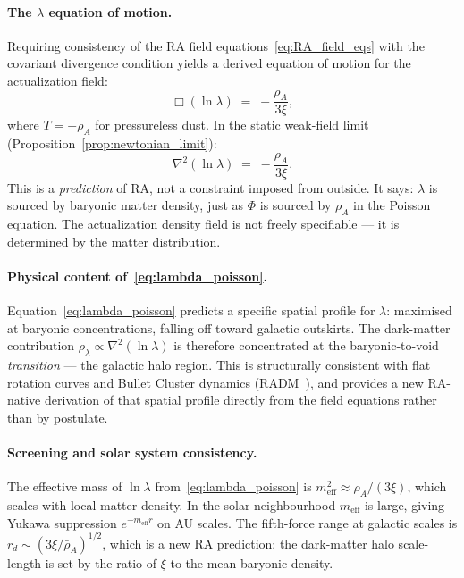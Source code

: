 \documentclass[11pt,a4paper]{article}
\theoremstyle{plain}
\theoremstyle{definition}
\theoremstyle{remark}
\begin{document}
\begin{description}
\paragraph{The $\lambda$ equation of motion.}
Requiring consistency of the RA field equations~\eqref{eq:RA_field_eqs} with
the covariant divergence condition yields a derived equation of motion for the
actualization field:
\begin{equation}
  \Box(\ln\lambda) \;=\; -\frac{\rho_A}{3\xi},
  \label{eq:lambda_eom}
\end{equation}
where $T = -\rho_A$ for pressureless dust. In the static weak-field limit
(Proposition~\ref{prop:newtonian_limit}):
\begin{equation}
  \nabla^2(\ln\lambda) \;=\; -\frac{\rho_A}{3\xi}.
  \label{eq:lambda_poisson}
\end{equation}
This is a \emph{prediction} of RA, not a constraint imposed from outside.
It says: $\lambda$ is sourced by baryonic matter density, just as $\Phi$
is sourced by $\rho_A$ in the Poisson equation. The actualization density
field is not freely specifiable --- it is determined by the matter distribution.

\paragraph{Physical content of~\eqref{eq:lambda_poisson}.}
Equation~\eqref{eq:lambda_poisson} predicts a specific spatial profile for $\lambda$:
maximised at baryonic concentrations, falling off toward galactic outskirts.
The dark-matter contribution $\rho_\lambda \propto \nabla^2(\ln\lambda)$ is therefore
concentrated at the baryonic-to-void \emph{transition} --- the galactic halo region.
This is structurally consistent with flat rotation curves and Bullet Cluster dynamics
(RADM~\citep{Sandeman2026RADM}), and provides a new RA-native derivation of
that spatial profile directly from the field equations rather than by postulate.

\paragraph{Screening and solar system consistency.}
The effective mass of $\ln\lambda$ from~\eqref{eq:lambda_poisson} is
$m_{\mathrm{eff}}^2 \approx \rho_A/(3\xi)$, which scales with local matter density.
In the solar neighbourhood $m_{\mathrm{eff}}$ is large, giving Yukawa suppression
$e^{-m_{\mathrm{eff}} r}$ on AU scales. The fifth-force range at galactic scales
is $r_d \sim (3\xi/\bar\rho_A)^{1/2}$, which is a new RA prediction: the
dark-matter halo scale-length is set by the ratio of $\xi$ to the mean baryonic
density.


\end{description}
\end{document}
